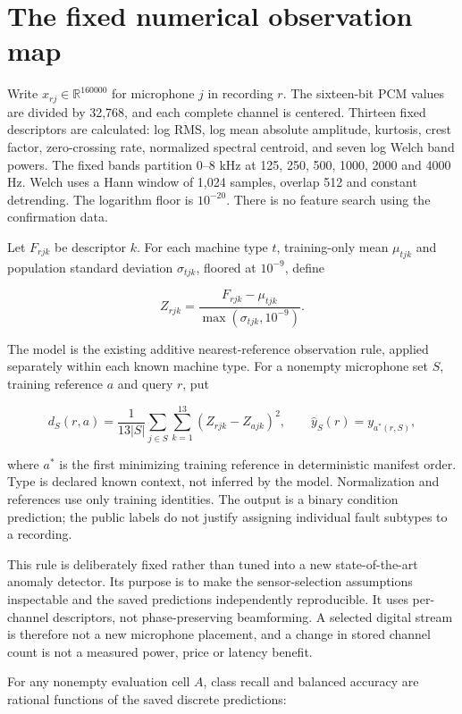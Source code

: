 \documentclass[
  11pt,
  a4paper,
]{report}
\begin{document}
\hypertarget{the-fixed-numerical-observation-map}{%
\section{The fixed numerical observation
map}\label{the-fixed-numerical-observation-map}}

Write \(x_{rj}\in\mathbb R^{160000}\) for microphone \(j\) in recording
\(r\). The sixteen-bit PCM values are divided by 32,768, and each
complete channel is centered. Thirteen fixed descriptors are calculated:
log RMS, log mean absolute amplitude, kurtosis, crest factor,
zero-crossing rate, normalized spectral centroid, and seven log Welch
band powers. The fixed bands partition 0--8 kHz at 125, 250, 500, 1000,
2000 and 4000 Hz. Welch uses a Hann window of 1,024 samples, overlap 512
and constant detrending. The logarithm floor is \(10^{-20}\). There is
no feature search using the confirmation data.

Let \(F_{rjk}\) be descriptor \(k\). For each machine type \(t\),
training-only mean \(\mu_{tjk}\) and population standard deviation
\(\sigma_{tjk}\), floored at \(10^{-9}\), define

\[
Z_{rjk}=\frac{F_{rjk}-\mu_{tjk}}{\max(\sigma_{tjk},10^{-9})}.
\]

The model is the existing additive nearest-reference observation rule,
applied separately within each known machine type. For a nonempty
microphone set \(S\), training reference \(a\) and query \(r\), put

\[
d_S(r,a)=\frac1{13|S|}\sum_{j\in S}\sum_{k=1}^{13}(Z_{rjk}-Z_{ajk})^2,
\qquad
\widehat y_S(r)=y_{a^*(r,S)},
\]

where \(a^*\) is the first minimizing training reference in
deterministic manifest order. Type is declared known context, not
inferred by the model. Normalization and references use only training
identities. The output is a binary condition prediction; the public
labels do not justify assigning individual fault subtypes to a
recording.

This rule is deliberately fixed rather than tuned into a new
state-of-the-art anomaly detector. Its purpose is to make the
sensor-selection assumptions inspectable and the saved predictions
independently reproducible. It uses per-channel descriptors, not
phase-preserving beamforming. A selected digital stream is therefore not
a new microphone placement, and a change in stored channel count is not
a measured power, price or latency benefit.

For any nonempty evaluation cell \(A\), class recall and balanced
accuracy are rational functions of the saved discrete predictions:
\end{document}
